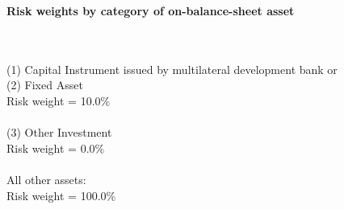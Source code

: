 \documentclass{article}
\begin{document}
\setlength{\parindent}{0em}
\begin{center}{\bf Risk weights by category of on-balance-sheet asset}\end{center}
~\\
~\\

(1) Capital Instrument issued by multilateral development bank or \\
(2) Fixed Asset \\
Risk weight = 10.0\%\\

~\\
(3) Other Investment\\
Risk weight = 0.0\%\\

~\\
All other assets:\\
Risk weight = 100.0\%\\

~\\
\end{document}
